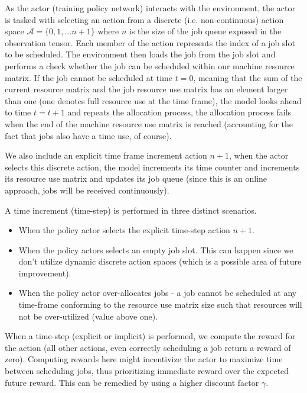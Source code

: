 \documentclass{article}
\begin{document}
\begin{spacing}{2.0}
As the actor (training policy network) interacts with the environment, the actor is tasked with selecting an action from a discrete (i.e. non-continuous)
action space $\mathcal{A} = \{ 0, 1, \dots n + 1 \}$ where $n$ is the size of the job queue exposed in the observation tensor. Each member of the action
represents the index of a job slot to be scheduled. The environment then loads the job from the job slot and performs a check whether the job can be scheduled
within our machine resource matrix. If the job cannot be scheduled at time $t = 0$, meaning that the sum of the current resource matrix and the job resource
use matrix has an element larger than one (one denotes full resource use at the time frame), the model looks ahead to time $t = t + 1$ and repeats the allocation
process, the allocation process fails when the end of the machine resource use matrix is reached (accounting for the fact that jobs also have a time use, of course).

We also include an explicit time frame increment action $n + 1$, when the actor selects this discrete action, the model increments its time counter and increments its resource use matrix and updates its job queue (since this is an online approach, jobs will be received continuously).

A time increment (time-step) is performed in three distinct scenarios.

\begin{itemize}
    \item When the policy actor selects the explicit time-step action $n + 1$.
    \item When the policy actors selects an empty job slot. This can happen since we don't utilize dynamic discrete action spaces (which is a possible area of future improvement).
    \item When the policy actor over-allocates jobs - a job cannot be scheduled at any time-frame conforming to the resource use matrix size such that resources will
    not be over-utilized (value above one).
\end{itemize}

When a time-step (explicit or implicit) is performed, we compute the reward for the action (all other actions, even correctly scheduling a job return a reward of zero).
Computing rewards here might incentivize the actor to maximize time between scheduling jobs, thus prioritizing immediate reward over the expected future reward.
This can be remedied by using a higher discount factor $\gamma$.


\end{spacing}
\end{document}
